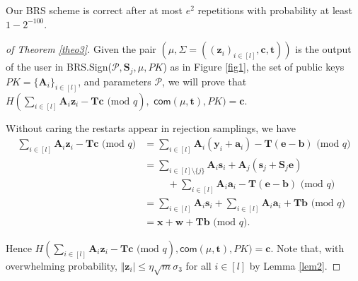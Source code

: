 \documentclass[runningheads]{llncs}
\begin{document}
\begin{theorem} \label{theo3} Our BRS scheme is correct after at most $e^2$ repetitions with probability at least $1-2^{-100}$.
\end{theorem}

\begin{proof}[of Theorem \ref{theo3}] Given the pair $(\mu,\Sigma=( (\mathbf{z}_i)_{i \in [l]}, \mathbf{c}, \mathbf{t}))$ is the output of the user in \textsf{BRS.Sign}($\mathcal{P}, \mathbf{S}_j,\mu, PK $) as in Figure \ref{fig1}, the set of public keys $PK=\{\mathbf{A}_i\}_{i \in [l]}$, and parameters $\mathcal{P}$, we will prove that $H(\sum_{i \in [l]}\mathbf{A}_i\mathbf{z}_i -\mathbf{T}\mathbf{c}\text{ (mod } q),$ $\mathsf{com}(\mu, \mathbf{t}), PK)=\mathbf{c}.$
	
	Without caring the restarts appear in rejection samplings, we have 
	\begin{align*}\sum_{i \in [l]}\mathbf{A}_i\mathbf{z}_i -\mathbf{T}\mathbf{c}\text{ (mod } q)&=\sum_{i \in [l]}\mathbf{A}_i(\mathbf{y}_i+\mathbf{a}_i) -\mathbf{T}(\mathbf{e}-\mathbf{b})\text{ (mod } q)\\
	&=\sum_{i \in [l]\setminus\{j\}}\mathbf{A}_i\mathbf{s}_i+\mathbf{A}_j(\mathbf{s}_j+\mathbf{S}_j\mathbf{e})\\&\hspace{1cm}+\sum_{i \in [l]}\mathbf{A}_i\mathbf{a}_i -\mathbf{T}(\mathbf{e}-\mathbf{b})\text{ (mod } q)\\
	&=\sum_{i \in [l]}\mathbf{A}_i\mathbf{s}_i+\sum_{i \in [l]}\mathbf{A}_i\mathbf{a}_i+\mathbf{T}\mathbf{b} \text{ (mod } q)\\
	&=\mathbf{x}+\mathbf{w}+\mathbf{T}\mathbf{b} \text{ (mod } q).
	\end{align*}
	
Hence $H(\sum_{i \in [l]}\mathbf{A}_i\mathbf{z}_i -\mathbf{T}\mathbf{c}\text{ (mod } q), \mathsf{com}(\mu, \mathbf{t}), PK)=\mathbf{c}$.  Note that, with overwhelming probability, $\Vert \mathbf{z}_i\vert \leq \eta\sqrt{m}\sigma_3$ for all $i\in [l]$ by Lemma \ref{lem2}. 
	

\end{proof}
\end{document}
